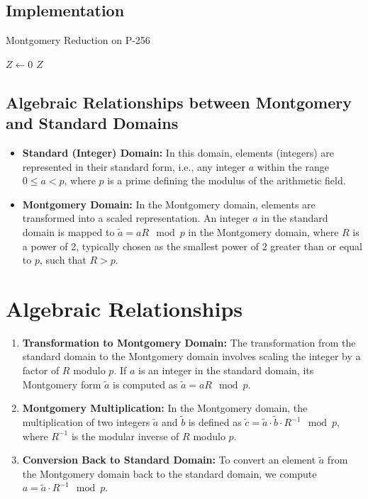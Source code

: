 \subsection{Implementation}
\begin{algorithm}[H]
	\DontPrintSemicolon
	\caption{Montgomery Reduction on P-256}
	\BlankLine
	\BlankLine
	$Z\gets 0$
	\Return $Z$
\end{algorithm}

\newpage
\subsection{Algebraic Relationships between Montgomery and Standard Domains}

\begin{itemize}
\item \textbf{Standard (Integer) Domain:} In this domain, elements (integers) are represented in their standard form, i.e., any integer $a$ within the range $0 \leq a < p$, where $p$ is a prime defining the modulus of the arithmetic field.
\item \textbf{Montgomery Domain:} In the Montgomery domain, elements are transformed into a scaled representation. An integer $a$ in the standard domain is mapped to $\widetilde{a} = aR \mod p$ in the Montgomery domain, where $R$ is a power of 2, typically chosen as the smallest power of 2 greater than or equal to $p$, such that $R > p$.
\end{itemize}

\section*{Algebraic Relationships}

\begin{enumerate}
	\item \textbf{Transformation to Montgomery Domain:} The transformation from the standard domain to the Montgomery domain involves scaling the integer by a factor of $R$ modulo $p$. If $a$ is an integer in the standard domain, its Montgomery form $\widetilde{a}$ is computed as $\widetilde{a} = aR \mod p$.
	\item \textbf{Montgomery Multiplication:} In the Montgomery domain, the multiplication of two integers $\widetilde{a}$ and $\widetilde{b}$ is defined as $\widetilde{c} = \widetilde{a} \cdot \widetilde{b} \cdot R^{-1} \mod p$, where $R^{-1}$ is the modular inverse of $R$ modulo $p$.
	\item \textbf{Conversion Back to Standard Domain:} To convert an element $\widetilde{a}$ from the Montgomery domain back to the standard domain, we compute $a = \widetilde{a} \cdot R^{-1} \mod p$.
\end{enumerate}

